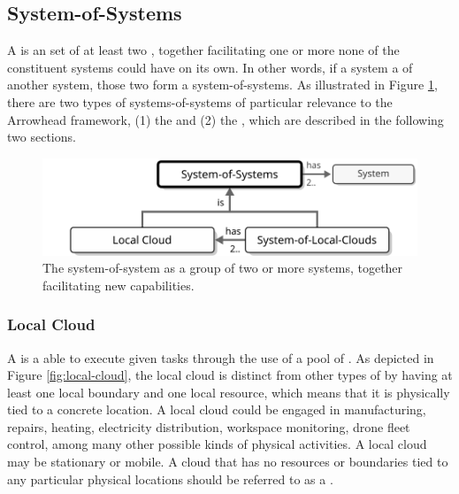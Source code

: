 \subsection{System-of-Systems}
\label{sec:reference-model:system-of-systems}

A  is an  set of at least two , together facilitating one or more  none of the constituent systems could have on its own.
In other words, if a system  a  of another system, those two form a system-of-systems.
As illustrated in Figure \ref{fig:system-of-systems}, there are two types of systems-of-systems of particular relevance to the Arrowhead framework, (1) the  and (2) the , which are described in the following two sections.

\begin{figure}[ht!]
  \centering
  \includegraphics[scale=0.9]{figures/system-of-systems}
  \caption{
    The system-of-system as a group of two or more systems, together facilitating new capabilities.
  }
  \label{fig:system-of-systems}
\end{figure}

\subsubsection{Local Cloud}
\label{sec:reference-model:system-of-systems:local-cloud}

A  is a   able to execute given tasks through the use of a pool of .
As depicted in Figure \ref{fig:local-cloud}, the local cloud is distinct from other types of  by having at least one local boundary and one local resource, which means that it is physically tied to a concrete location.
A local cloud could be engaged in manufacturing, repairs, heating, electricity distribution, workspace monitoring, drone fleet control, among many other possible kinds of physical activities.
A local cloud may be stationary or mobile.
A cloud that has no resources or boundaries tied to any particular physical locations should be referred to as a .

